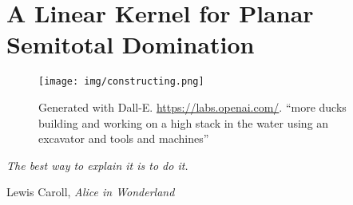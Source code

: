 \chapter{A Linear Kernel for Planar Semitotal Domination}

\vspace*{-50pt}
\begin{figure}[ht]
\texttt{[image: img/constructing.png]}
        \captionsetup{textformat=empty,labelformat=blank}
        \caption{Generated with Dall-E. \url{https://labs.openai.com/}. ``more ducks building and working on  a high stack in the water using an excavator and tools and machines''}
\end{figure}

\epigraph{\itshape The best way to explain it is to do it.}{Lewis Caroll, \textit{Alice in Wonderland}}

